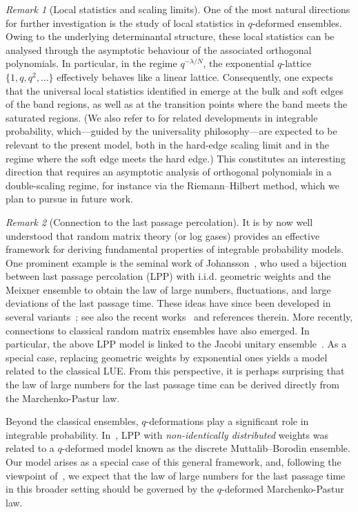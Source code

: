 \documentclass{amsart}
\theoremstyle{plain}
\theoremstyle{remark}
\newtheorem{rem}{Remark}
\numberwithin{equation}{section}
\begin{document}
\begin{rem}[Local statistics and scaling limits]
One of the most natural directions for further investigation is the study of local statistics in $q$-deformed ensembles. Owing to the underlying determinantal structure, these local statistics can be analysed through the asymptotic behaviour of the associated orthogonal polynomials. In particular, in the regime $q^{-\lambda/N}$, the exponential $q$-lattice $\{1,q,q^2,\dots\}$ effectively behaves like a linear lattice. Consequently, one expects that the universal local statistics identified in \cite{BKMM} emerge at the bulk and soft edges of the band regions, as well as at the transition points where the band meets the saturated regions. (We also refer to \cite{BO24,GS25} for related developments in integrable probability, which---guided by the universality philosophy---are expected to be relevant to the present model, both in the hard-edge scaling limit and in the regime where the soft edge meets the hard edge.)
This constitutes an interesting direction that requires an asymptotic analysis of orthogonal polynomials in a double-scaling regime, for instance via the Riemann--Hilbert method, which we plan to pursue in future work.
\end{rem}


\begin{rem}[Connection to the last passage percolation] \label{Rem_LPP}
It is by now well understood that random matrix theory (or log gases) provides an effective framework for deriving fundamental properties of integrable probability models. One prominent example is the seminal work of Johansson~\cite{Joh00}, who used a bijection between last passage percolation (LPP) with i.i.d. geometric weights and the Meixner ensemble to obtain the law of large numbers, fluctuations, and large deviations of the last passage time. These ideas have since been developed in several variants~\cite{BR01,FW04}; see also the recent works~\cite{BS25,BCMS25,GS25,CMR26} and references therein. More recently, connections to classical random matrix ensembles have also emerged. In particular, the above LPP model is linked to the Jacobi unitary ensemble~\cite{BCMS25}. As a special case, replacing geometric weights by exponential ones yields a model related to the classical LUE. From this perspective, it is perhaps surprising that the law of large numbers for the last passage time can be derived directly from the Marchenko-Pastur law.

Beyond the classical ensembles, $q$-deformations play a significant role in integrable probability. In~\cite{BO24}, LPP with \emph{non-identically distributed} weights was related to a $q$-deformed model known as the discrete Muttalib--Borodin ensemble. Our model arises as a special case of this general framework, and, following the viewpoint of~\cite{BCMS25}, we expect that the law of large numbers for the last passage time in this broader setting should be governed by the $q$-deformed Marchenko-Pastur law. 
\end{rem}
 
\end{document}
